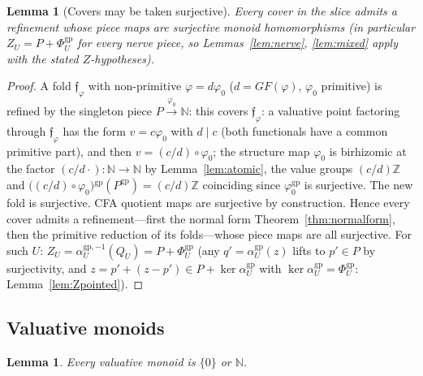 \documentclass[11pt]{article}
\newtheorem{lemma}[theorem]{Lemma}
\theoremstyle{definition}
\newcommand{\gp}{\mathrm{gp}}
\newcommand{\Z}{\mathbb{Z}}
\begin{document}
\begin{lemma}[Covers may be taken surjective]\label{lem:surj}
Every cover in the slice admits a refinement whose piece maps are
surjective monoid homomorphisms
\textup{(}in particular
$Z_U=P+\Phi_U^{\gp}$ for every nerve piece, so
Lemmas~\ref{lem:nerve}, \ref{lem:mixed} apply with the stated
$Z$-hypotheses\textup{)}.
\end{lemma}

\begin{proof}
A fold $\mathfrak f_\varphi$
with non-primitive
$\varphi=d\varphi_0$ \textup{(}$d={GF}(\varphi)$, $\varphi_0$
primitive\textup{)} is refined by the singleton piece
$P\xrightarrow{\varphi_0}\mathbb N$: this covers
$\mathfrak f_\varphi$: a valuative point factoring through
$\mathfrak f_\varphi$ has the form $v=c\varphi_0$ with
$d\mid c$ (both functionals have a common primitive part), and
then $v=(c/d)\circ\varphi_0$; the structure map $\varphi_0$ is
birhizomic at the factor $(c/d\cdot):\mathbb N\to\mathbb N$ by
Lemma~\ref{lem:atomic}, the value groups $(c/d)\Z$ and
$\bigl((c/d)\circ\varphi_0\bigr){}^{\gp}(P^{\gp})=(c/d)\Z$
coinciding since $\varphi_0^{\gp}$ is surjective. The new fold
is surjective. CFA quotient
maps are surjective by construction. Hence every cover admits a
refinement---first the normal form
Theorem~\ref{thm:normalform}, 
then the primitive reduction of
its folds---whose piece maps are all surjective. For such $U$:
$Z_U=\alpha_U^{\gp,-1}(Q_U)=P+\Phi_U^{\gp}$ \textup{(}any
$q'=\alpha_U^{\gp}(z)$ lifts to $p'\in P$ by surjectivity, and
$z=p'+(z-p')\in P+\ker\alpha_U^{\gp}$ with
$\ker\alpha_U^{\gp}=\Phi_U^{\gp}$:
Lemma~\ref{lem:Zpointed}\textup{)}.
\end{proof}

\subsection{Valuative monoids}

\begin{lemma}\label{lem:N}
Every valuative monoid is $\{0\}$ or $\mathbb N$.
\end{lemma}
\end{document}
